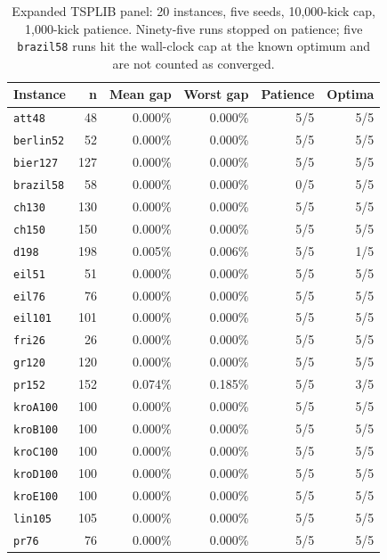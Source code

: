 \documentclass[pdflatex,sn-mathphys-num]{sn-jnl}
\begin{document}
\begin{table}[t]
\centering
\caption{Expanded TSPLIB panel: 20 instances, five seeds, 10,000-kick cap, 1,000-kick patience.
Ninety-five runs stopped on patience; five \texttt{brazil58} runs hit the wall-clock cap at the known
optimum and are not counted as converged.}
\label{tab:tsp-expanded}
\small
\begin{tabular}{lrrrrr}
\toprule
Instance & n & Mean gap & Worst gap & Patience & Optima \\
\midrule
\texttt{att48} & 48 & 0.000\% & 0.000\% & 5/5 & 5/5 \\
\texttt{berlin52} & 52 & 0.000\% & 0.000\% & 5/5 & 5/5 \\
\texttt{bier127} & 127 & 0.000\% & 0.000\% & 5/5 & 5/5 \\
\texttt{brazil58} & 58 & 0.000\% & 0.000\% & 0/5 & 5/5 \\
\texttt{ch130} & 130 & 0.000\% & 0.000\% & 5/5 & 5/5 \\
\texttt{ch150} & 150 & 0.000\% & 0.000\% & 5/5 & 5/5 \\
\texttt{d198} & 198 & 0.005\% & 0.006\% & 5/5 & 1/5 \\
\texttt{eil51} & 51 & 0.000\% & 0.000\% & 5/5 & 5/5 \\
\texttt{eil76} & 76 & 0.000\% & 0.000\% & 5/5 & 5/5 \\
\texttt{eil101} & 101 & 0.000\% & 0.000\% & 5/5 & 5/5 \\
\texttt{fri26} & 26 & 0.000\% & 0.000\% & 5/5 & 5/5 \\
\texttt{gr120} & 120 & 0.000\% & 0.000\% & 5/5 & 5/5 \\
\texttt{pr152} & 152 & 0.074\% & 0.185\% & 5/5 & 3/5 \\
\texttt{kroA100} & 100 & 0.000\% & 0.000\% & 5/5 & 5/5 \\
\texttt{kroB100} & 100 & 0.000\% & 0.000\% & 5/5 & 5/5 \\
\texttt{kroC100} & 100 & 0.000\% & 0.000\% & 5/5 & 5/5 \\
\texttt{kroD100} & 100 & 0.000\% & 0.000\% & 5/5 & 5/5 \\
\texttt{kroE100} & 100 & 0.000\% & 0.000\% & 5/5 & 5/5 \\
\texttt{lin105} & 105 & 0.000\% & 0.000\% & 5/5 & 5/5 \\
\texttt{pr76} & 76 & 0.000\% & 0.000\% & 5/5 & 5/5 \\
\bottomrule
\end{tabular}
\end{table}
\end{document}
